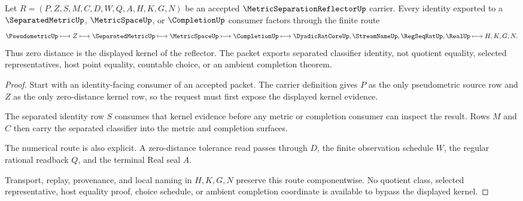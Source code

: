 \begin{theorem}
\label{thm:metric-separation-reflector-zero-distance-kernel}
Let $R=(P,Z,S,M,C,D,W,Q,A,H,K,G,N)$ be an accepted
$\MetricSeparationReflectorUp$ carrier. Every identity exported to a
$\SeparatedMetricUp$, $\MetricSpaceUp$, or $\CompletionUp$ consumer factors
through the finite route
$$
\PseudometricUp \longmapsto Z \longmapsto \SeparatedMetricUp
\longmapsto \MetricSpaceUp \longmapsto \CompletionUp
\longmapsto \DyadicRatCoreUp,\StreamNameUp,\RegSeqRatUp,\RealUp
\longmapsto H,K,G,N .
$$
Thus zero distance is the displayed kernel of the reflector. The packet
exports separated classifier identity, not quotient equality, selected
representatives, host point equality, countable choice, or an ambient
completion theorem.
\end{theorem}
\begin{proof}
Start with an identity-facing consumer of an accepted packet. The carrier
definition gives $P$ as the only pseudometric source row and $Z$ as the only
zero-distance kernel row, so the request must first expose the displayed
kernel evidence.

The separated identity row $S$ consumes that kernel evidence before any metric
or completion consumer can inspect the result. Rows $M$ and $C$ then carry the
separated classifier into the metric and completion surfaces.

The numerical route is also explicit. A zero-distance tolerance read passes
through $D$, the finite observation schedule $W$, the regular rational
readback $Q$, and the terminal Real seal $A$.

Transport, replay, provenance, and local naming in $H,K,G,N$ preserve this
route componentwise. No quotient class, selected representative, host
equality proof, choice schedule, or ambient completion coordinate is available
to bypass the displayed kernel.
\end{proof}


